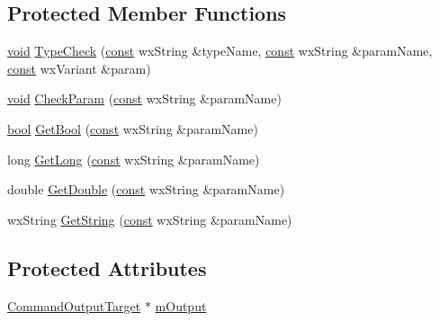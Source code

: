 \subsection*{Protected Member Functions}
\begin{DoxyCompactItemize}
\item 
\hyperlink{sound_8c_ae35f5844602719cf66324f4de2a658b3}{void} \hyperlink{class_command_implementation_ab1f51c9e2ff4c15600deffbdf37388bd}{Type\+Check} (\hyperlink{getopt1_8c_a2c212835823e3c54a8ab6d95c652660e}{const} wx\+String \&type\+Name, \hyperlink{getopt1_8c_a2c212835823e3c54a8ab6d95c652660e}{const} wx\+String \&param\+Name, \hyperlink{getopt1_8c_a2c212835823e3c54a8ab6d95c652660e}{const} wx\+Variant \&param)
\item 
\hyperlink{sound_8c_ae35f5844602719cf66324f4de2a658b3}{void} \hyperlink{class_command_implementation_a58a040a15bfcf335652712ffd75fbfd6}{Check\+Param} (\hyperlink{getopt1_8c_a2c212835823e3c54a8ab6d95c652660e}{const} wx\+String \&param\+Name)
\item 
\hyperlink{mac_2config_2i386_2lib-src_2libsoxr_2soxr-config_8h_abb452686968e48b67397da5f97445f5b}{bool} \hyperlink{class_command_implementation_a0c64e18dd9184aef5fdaf30d686603d8}{Get\+Bool} (\hyperlink{getopt1_8c_a2c212835823e3c54a8ab6d95c652660e}{const} wx\+String \&param\+Name)
\item 
long \hyperlink{class_command_implementation_ac00cf191d7254cc0342c36c425d51b1b}{Get\+Long} (\hyperlink{getopt1_8c_a2c212835823e3c54a8ab6d95c652660e}{const} wx\+String \&param\+Name)
\item 
double \hyperlink{class_command_implementation_ae898667210d3cacfc3cf2d96c37be0ee}{Get\+Double} (\hyperlink{getopt1_8c_a2c212835823e3c54a8ab6d95c652660e}{const} wx\+String \&param\+Name)
\item 
wx\+String \hyperlink{class_command_implementation_ae678cced66f56946ba5f6b264923b024}{Get\+String} (\hyperlink{getopt1_8c_a2c212835823e3c54a8ab6d95c652660e}{const} wx\+String \&param\+Name)
\end{DoxyCompactItemize}
\subsection*{Protected Attributes}
\begin{DoxyCompactItemize}
\item 
\hyperlink{class_command_output_target}{Command\+Output\+Target} $\ast$ \hyperlink{class_command_implementation_acb56bdb1d02b115161db36e321909c7d}{m\+Output}
\end{DoxyCompactItemize}


